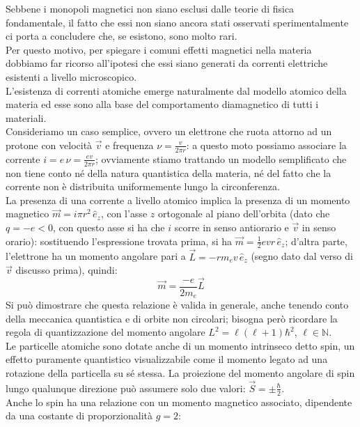 Sebbene i monopoli magnetici non siano esclusi dalle teorie di fisica fondamentale, il fatto che essi non siano ancora stati osservati sperimentalmente ci porta a concludere che, se esistono, sono molto rari. \\ 
Per questo motivo, per spiegare i comuni effetti magnetici nella materia dobbiamo far ricorso all'ipotesi che essi siano generati da correnti elettriche esistenti a livello microscopico. \\ 
%
L'esistenza di correnti atomiche emerge naturalmente dal modello atomico della materia ed esse sono alla base del comportamento diamagnetico di tutti i materiali. \\ 
%
Consideriamo un caso semplice, ovvero un elettrone che ruota attorno ad un protone con velocità $ \vec{v} $ e frequenza $ \nu = \frac{v}{2\pi r} $: a questo moto possiamo associare la corrente $ i = e\,\nu = \frac{ev}{2\pi r} $; ovviamente stiamo trattando un modello semplificato che non tiene conto né della natura quantistica della materia, né del fatto che la corrente non è distribuita uniformemente lungo la circonferenza. \\ 
La presenza di una corrente a livello atomico implica la presenza di un momento magnetico $ \vec{m} = i \pi r^2 \,\hat{e}_z $, con l'asse $ z $ ortogonale al piano dell'orbita (dato che $ q = -e < 0 $, con questo asse si ha che $ i $ scorre in senso antiorario e $ \vec{v} $ in senso orario): sostituendo l'espressione trovata prima, si ha $ \vec{m} = \frac{1}{2} evr \,\hat{e}_z $; d'altra parte, l'elettrone ha un momento angolare pari a $ \vec{L} = - r m_e v \,\hat{e}_z  $ (segno dato dal verso di $ \vec{v} $ discusso prima), quindi:
\begin{equation}
	\vec{m} = \frac{-e}{2m_e}\vec{L}
	\label{eq:1}
\end{equation}
Si può dimostrare che questa relazione è valida in generale, anche tenendo conto della meccanica quantistica e di orbite non circolari; bisogna però ricordare la regola di quantizzazione del momento angolare $ L^2 = \ell(\ell+1)\hbar^2 $, $ \ell \in \mathbb{N} $. \\ 
%
Le particelle atomiche sono dotate anche di un momento intrinseco detto spin, un effetto puramente quantistico visualizzabile come il momento legato ad una rotazione della particella su sé stessa. La proiezione del momento angolare di spin lungo qualunque direzione può assumere solo due valori: $ \vec{S} = \pm \frac{\hbar}{2} $. \\ 
Anche lo spin ha una relazione con un momento magnetico associato, dipendente da una costante di proporzionalità $ g = 2 $:
